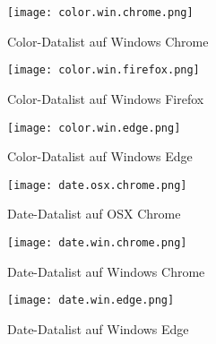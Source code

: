 \begin{figure}[!htb]
    \centering
    \begin{minipage}[b]{0.28\textwidth}
        \centering
        \texttt{[image: color.win.chrome.png]}
        \caption{\centering Color-Datalist auf Windows Chrome}
        \label{img:colorWinChromeDatalist}
    \end{minipage}
    \hfill
    \begin{minipage}[b]{0.28\textwidth}
        \centering
        \texttt{[image: color.win.firefox.png]}
        \caption{\centering Color-Datalist auf Windows Firefox}
        \label{img:colorWinFirefoxDatalist}
    \end{minipage}
    \hfill
    \begin{minipage}[b]{0.28\textwidth}
        \centering
        \texttt{[image: color.win.edge.png]}
        \caption{\centering Color-Datalist auf Windows Edge}
        \label{img:colorWinEdgeDatalist}
    \end{minipage}
\end{figure}


\begin{figure}[!htb]
    \centering
    \begin{minipage}[b]{0.28\textwidth}
        \centering
        \texttt{[image: date.osx.chrome.png]}
        \caption{\centering Date-Datalist auf OSX Chrome}
        \label{img:dateOsxChromeDatalist}
    \end{minipage}
    \hfill
    \begin{minipage}[b]{0.28\textwidth}
        \centering
        \texttt{[image: date.win.chrome.png]}
        \caption{\centering Date-Datalist auf Windows Chrome}
        \label{img:dateWinChromeDatalist}
    \end{minipage}
    \hfill
    \begin{minipage}[b]{0.28\textwidth}
        \centering
        \texttt{[image: date.win.edge.png]}
        \caption{\centering Date-Datalist auf Windows Edge}
        \label{img:dateWinEdgeDatalist}
    \end{minipage}
\end{figure}


